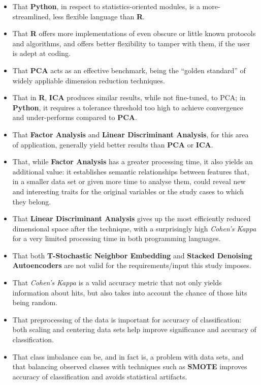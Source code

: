 \documentclass[]{article}
\begin{document}
\begin{itemize}
\itemsep1pt\parskip0pt
\item
  That \textbf{Python}, in respect to statistics-oriented modules, is a
  more-streamlined, less flexible language than \textbf{R}.
\item
  That \textbf{R} offers more implementations of even obscure or little
  known protocols and algorithms, and offers better flexibility to
  tamper with them, if the user is adept at coding.
\item
  That \textbf{PCA} acts as an effective benchmark, being the ``golden
  standard'' of widely appliable dimension reduction techniques.\\
\item
  That in \textbf{R}, \textbf{ICA} produces similar results, while not
  fine-tuned, to PCA; in \textbf{Python}, it requires a tolerance
  threshold too high to achieve convergence and under-performs compared
  to \textbf{PCA}.\\
\item
  That \textbf{Factor Analysis} and \textbf{Linear Discriminant
  Analysis}, for this area of application, generally yield better
  results than \textbf{PCA} or \textbf{ICA}.\\
\item
  That, while \textbf{Factor Analysis} has a greater processing time, it
  also yields an additional value: it establishes semantic relationships
  between features that, in a smaller data set or given more time to
  analyse them, could reveal new and interesting traits for the original
  variables or the study cases to which they belong.\\
\item
  That \textbf{Linear Discriminant Analysis} gives up the most
  efficiently reduced dimensional space after the technique, with a
  surprisingly high \emph{Cohen's Kappa} for a very limited processing
  time in both programming languages.\\
\item
  That both \textbf{T-Stochastic Neighbor Embedding} and \textbf{Stacked
  Denoising Autoencoders} are not valid for the requirements/input this
  study imposes.\\
\item
  That \emph{Cohen's Kappa} is a valid accuracy metric that not only
  yields information about hits, but also takes into account the chance
  of those hits being random.\\
\item
  That preprocessing of the data is important for accuracy of
  classification: both scaling and centering data sets help improve
  significance and accuracy of classification.\\
\item
  That class imbalance can be, and in fact is, a problem with data sets,
  and that balancing observed classes with techniques such as
  \textbf{SMOTE} improves accuracy of classification and avoids
  statistical artifacts.
\end{itemize}
\end{document}
